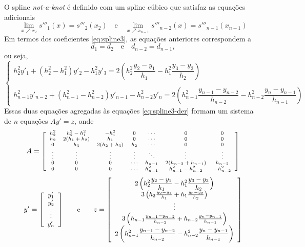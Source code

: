 O spline \textit{not-a-knot} é definido com um spline cúbico que satisfaz as equações adicionais
\begin{equation*}
	\lim\limits_{x\nearrow x_2 }s'''_1(x)=s'''_2(x_2)\quad\text{e}\quad	\lim\limits_{x\nearrow x_{n-1} }s'''_{n-2}(x)=s'''_{n-1}(x_{n-1})
\end{equation*}
Em termos dos coeficientes \eqref{eq:spline3}, as equações anteriores correspondem a 
\begin{equation*}
	d_1=d_2\quad\text{e}\quad d_{n-2}=d_{n-1},
\end{equation*}
ou seja,
\begin{equation*}
\left\{\begin{array}{l}
	h_2^2y'_1+(h_2^2-h_1^2)y'_2-h_1^2y'_3=2\left(h_2^2\dfrac{y_2-y_1}{h_1}-h_1^2\dfrac{y_3-y_2}{h_2}\right)\\
	\\
	h_{n-1}^2y'_{n-2}+(h_{n-1}^2-h_{n-2}^2)y'_{n-1}-h_{n-2}^2y'_n=2\left(h_{n-1}^2\dfrac{y_{n-1}-y_{n-2}}{h_{n-2}}-h_{n-2}^2\dfrac{y_n-y_{n-1}}{h_{n-1}}\right)
	\end{array}\right.
\end{equation*}
Essas duas equações agregadas às equações \eqref{eq:spline3-der} formam um sistema de $n$ equações $Ay' = z$, onde
\begin{equation*}
	\begin{scriptsize}
		A=\left[\begin{array}{ccccccc}
			h_2^2&h_2^2-h_1^2&-h_1^2&0&\cdots&0&0\\
			h_2&2(h_1+h_2)&h_1&0&\cdots&0&0\\
			0&h_3&2(h_2+h_3)&h_2&\cdots&0&0\\
			\vdots&\vdots&\vdots&\vdots&\ddots&\vdots&\vdots\\
			0&0&0&\cdots&h_{n-1} & 2(h_{n-2}+h_{n-1})&h_{n-2}\\
			0&0&0&\cdots &h_{n-1}^2&h_{n-1}^2-h_{n-2}^2&-h_{n-2}^2
		\end{array}\right] 
	\end{scriptsize} 
\end{equation*}
\begin{equation*}
	\begin{small}
		y'= \left[\begin{array}{c}
			y'_1\\
			y'_2\\
			\vdots\\
			y'_n
		\end{array}\right]\qquad \text{e}\qquad
		z = \left[\begin{array}{c}
			2\left(h_2^2\dfrac{y_2-y_1}{h_1}-h_1^2\dfrac{y_3-y_2}{h_2}\right)\\
			3\left(h_2\frac{y_2-y_1}{h_1}+h_1\frac{y_3-y_2}{h_2}\right)\\
			\vdots\\
			3\left(h_{n-1}\frac{y_{n-1}-y_{n-2}}{h_{n-2}}+h_{n-2}\frac{y_n-y_{n-1}}{h_{n-1}}\right)\\
			2\left(h_{n-1}^2\dfrac{y_{n-1}-y_{n-2}}{h_{n-2}}-h_{n-2}^2\dfrac{y_n-y_{n-1}}{h_{n-1}}\right)\\
		\end{array}\right]
	\end{small}
\end{equation*}
